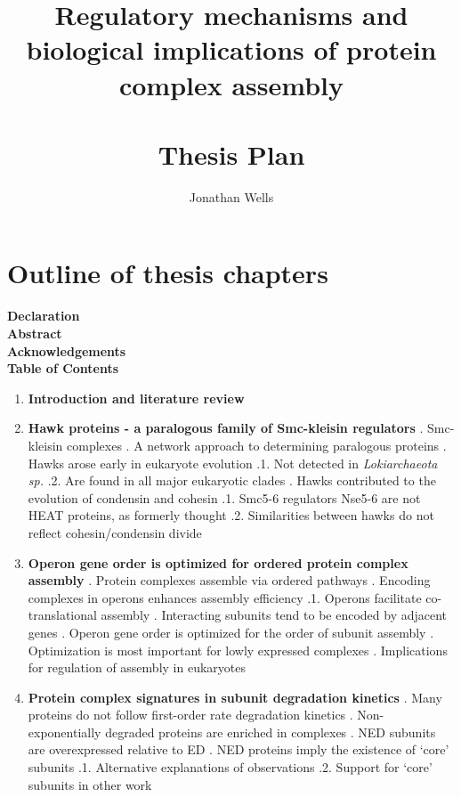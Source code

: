 \documentclass{article}
\begin{document}
\title{Regulatory mechanisms and biological implications of protein complex assembly\\~\\
Thesis Plan}
\author{Jonathan Wells}
\date{}
\maketitle

\newpage
\section*{Outline of thesis chapters}
\noindent
\textbf{Declaration\\
Abstract\\
Acknowledgements\\
Table of Contents}
\begin{enumerate}
    \item \textbf{Introduction and literature review}

    \item \textbf{Hawk proteins - a paralogous family of Smc-kleisin regulators}
        . Smc-kleisin complexes
        . A network approach to determining paralogous proteins
        . Hawks arose early in eukaryote evolution
            .1. Not detected in \textit{Lokiarchaeota sp.}
            .2. Are found in all major eukaryotic clades
        . Hawks contributed to the evolution of condensin and cohesin
            .1. Smc5-6 regulators Nse5-6 are not HEAT proteins, as formerly thought
            .2. Similarities between hawks do not reflect cohesin/condensin divide

    \item \textbf{Operon gene order is optimized for ordered protein complex assembly}
        . Protein complexes assemble via ordered pathways
        . Encoding complexes in operons enhances assembly efficiency
            .1. Operons facilitate co-translational assembly
        . Interacting subunits tend to be encoded by adjacent genes
        . Operon gene order is optimized for the order of subunit assembly
        . Optimization is most important for lowly expressed complexes
        . Implications for regulation of assembly in eukaryotes

    \item \textbf{Protein complex signatures in subunit degradation kinetics}
        . Many proteins do not follow first-order rate degradation kinetics
        . Non-exponentially degraded proteins are enriched in complexes
        . NED subunits are overexpressed relative to ED
        . NED proteins imply the existence of `core' subunits
            .1. Alternative explanations of observations
            .2. Support for `core' subunits in other work


\end{enumerate}
\end{document}
